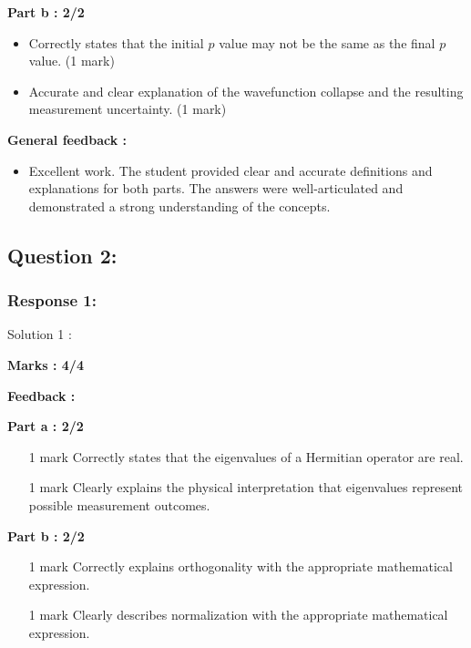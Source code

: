 \documentclass[a4paper,11pt]{article}
\begin{document}
\textbf{Part b : 2/2}

\begin{itemize}
    \item Correctly states that the initial $p$ value may not be the same as the final $p$ value. (1 mark)
    \item Accurate and clear explanation of the wavefunction collapse and the resulting measurement uncertainty. (1 mark)
\end{itemize}

\textbf{General feedback :}

\begin{itemize}
    \item Excellent work. The student provided clear and accurate definitions and explanations for both parts. The answers were well-articulated and demonstrated a strong understanding of the concepts.
\end{itemize}


\subsection*{Question 2:}

\subsubsection*{Response 1:}

Solution 1 : 

\textbf{Marks : 4/4}

\textbf{Feedback : }

\textbf{Part a : 2/2}

\begin{itemize}
    \item [1 mark] Correctly states that the eigenvalues of a Hermitian operator are real.
    \item [1 mark] Clearly explains the physical interpretation that eigenvalues represent possible measurement outcomes.
\end{itemize}


\textbf{Part b : 2/2}

\begin{itemize}
    \item [1 mark] Correctly explains orthogonality with the appropriate mathematical expression.
    \item [1 mark] Clearly describes normalization with the appropriate mathematical expression.
\end{itemize}
\end{document}
